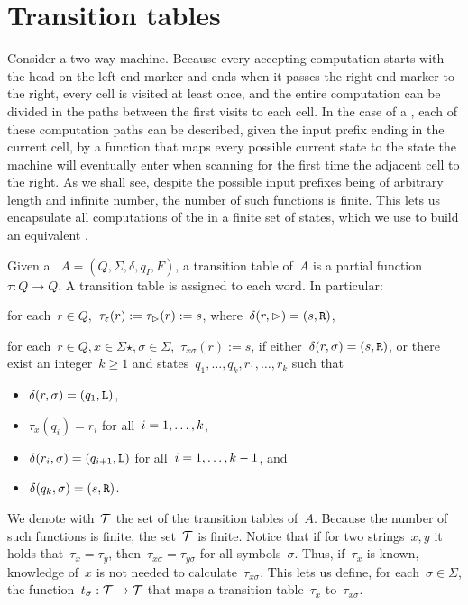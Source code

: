 \section{Transition tables}\label{sec:transtab2DFA}
Consider a two-way machine.
Because every accepting computation starts with the head on the left end-marker and ends when it passes the right end-marker to the right, every cell is visited at least once, and the entire computation can be divided in the paths between the first visits to each cell.
In the case of a \TDFA, each of these computation paths can be described, given the input prefix ending in the current cell, by a function that maps every possible current state to the state the machine will eventually enter when scanning for the first time the adjacent cell to the right.
As we shall see, despite the possible input prefixes being of arbitrary length and infinite number, the number of such functions is finite.
This lets us encapsulate all computations of the \TDFA in a finite set of states, which we use to build an equivalent \ODFA.

\begin{defn}\label{def:transtab2DFA}
	Given a \TDFA~$A=(Q,\Sigma,\delta,q_I,F)$, a transition table of~$A$ is a partial function~$\tau:Q\to Q$.
	A transition table is assigned to each word. In particular:
	\begin{rules}
		\item for each~$r\in Q$,~$\tau_\varepsilon(r):=\tau_\rhd(r):=s$, where~$\delta(r,\rhd)=(s,\mathtt R)$,
		\item for each~$r\in Q,x\in\Sigma\star,\sigma\in\Sigma$,~$\tau_{x\sigma}(r):=s$, if either~$\delta(r,\sigma)=(s,\mathtt R)$, or there exist an integer~$k\ge1$ and states~$q_1,\dots,q_k,r_1,\dots,r_k$ such that
		\begin{itemize}
			\item $\delta(r,\sigma)=(q_1,\mathtt L)$,
			\item $\tau_x(q_i)=r_i$ for all~$i=1,\dots,k$,
			\item $\delta(r_i,\sigma)=(q_{i+1},\mathtt L)$ for all~$i=1,\dots,k-1$, and
			\item $\delta(q_k,\sigma)=(s,\mathtt R)$.
		\end{itemize}
	\end{rules}
	We denote with~$\mathcal T$ the set of the transition tables of~$A$.
	Because the number of such functions is finite, the set~$\mathcal T$ is finite.
	Notice that if for two strings~$x,y$ it holds that~$\tau_x=\tau_y$, then~$\tau_{x\sigma}=\tau_{y\sigma}$ for all symbols~$\sigma$.
	Thus, if~$\tau_x$ is known, knowledge of~$x$ is not needed to calculate~$\tau_{x\sigma}$.
	This lets us define, for each~$\sigma\in\Sigma$, the function~$t_\sigma:\mathcal T\to\mathcal T$ that maps a transition table~$\tau_x$ to~$\tau_{x\sigma}$.
\end{defn}

